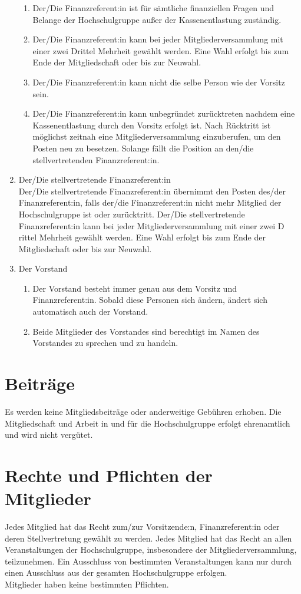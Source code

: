 \documentclass[11pt]{article}
\begin{document}
\begin{enumerate}
\begin{enumerate}
		      \item Der/Die Finanzreferent:in ist für sämtliche finanziellen Fragen und Belange der Hochschulgruppe außer der Kassenentlastung zuständig.
		      \item Der/Die Finanzreferent:in kann bei jeder Mitgliederversammlung mit einer zwei Drittel Mehrheit gewählt werden. Eine Wahl erfolgt bis zum Ende der Mitgliedschaft oder bis zur Neuwahl.
		      \item Der/Die Finanzreferent:in kann nicht die selbe Person wie der Vorsitz sein.
		      \item Der/Die Finanzreferent:in kann unbegründet zurücktreten nachdem eine Kassenentlastung durch den Vorsitz erfolgt ist. Nach Rücktritt ist möglichst zeitnah eine Mitgliederversammlung einzuberufen,  um den Posten neu zu besetzen. Solange fällt die Position an den/die stellvertretenden Finanzreferent:in.
	      \end{enumerate}
	\item Der/Die stellvertretende Finanzreferent:in\\
	      Der/Die stellvertretende Finanzreferent:in übernimmt den Posten des/der Finanzreferent:in, falls der/die Finanzreferent:in nicht mehr Mitglied der Hochschulgruppe ist oder zurücktritt. Der/Die stellvertretende Finanzreferent:in kann bei jeder Mitgliederversammlung mit einer zwei D
	      rittel Mehrheit gewählt werden. Eine Wahl erfolgt bis zum Ende der Mitgliedschaft oder bis zur Neuwahl.
	\item Der Vorstand
	      \begin{enumerate}
		      \item Der Vorstand besteht immer genau aus dem Vorsitz und Finanzreferent:in. Sobald diese Personen sich ändern, ändert sich automatisch auch der Vorstand.
		      \item Beide Mitglieder des Vorstandes sind berechtigt im Namen des Vorstandes zu sprechen und zu handeln.
	      \end{enumerate}
\end{enumerate}
\section{Beiträge}
Es werden keine Mitgliedsbeiträge oder anderweitige Gebühren erhoben. Die Mitgliedschaft und Arbeit in und für die Hochschulgruppe erfolgt ehrenamtlich und wird nicht vergütet.
\section{Rechte und Pflichten der Mitglieder}
Jedes Mitglied hat das Recht zum/zur Vorsitzende:n, Finanzreferent:in oder deren Stellvertretung gewählt zu werden. Jedes Mitglied hat das Recht an allen Veranstaltungen der Hochschulgruppe, insbesondere der Mitgliederversammlung, teilzunehmen. Ein Ausschluss von bestimmten Veranstaltungen kann nur durch einen Ausschluss aus der gesamten Hochschulgruppe erfolgen.\\
Mitglieder haben keine bestimmten Pflichten.
\end{document}
